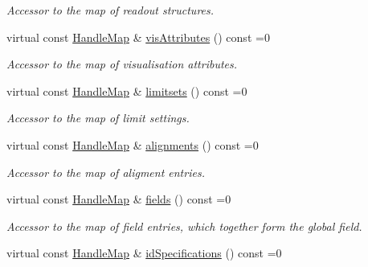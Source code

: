 \begin{DoxyCompactItemize}
\begin{DoxyCompactList}\small\item\em Accessor to the map of readout structures. \item\end{DoxyCompactList}\item 
virtual const \hyperlink{class_d_d4hep_1_1_geometry_1_1_l_c_d_d_a05cb11e7355772c7b0794bcca59bf477}{HandleMap} \& \hyperlink{class_d_d4hep_1_1_geometry_1_1_l_c_d_d_abb60505e37d62147725d126cb21d171b}{visAttributes} () const =0
\begin{DoxyCompactList}\small\item\em Accessor to the map of visualisation attributes. \item\end{DoxyCompactList}\item 
virtual const \hyperlink{class_d_d4hep_1_1_geometry_1_1_l_c_d_d_a05cb11e7355772c7b0794bcca59bf477}{HandleMap} \& \hyperlink{class_d_d4hep_1_1_geometry_1_1_l_c_d_d_aeacdfb972606fef31bc1b69e6e982956}{limitsets} () const =0
\begin{DoxyCompactList}\small\item\em Accessor to the map of limit settings. \item\end{DoxyCompactList}\item 
virtual const \hyperlink{class_d_d4hep_1_1_geometry_1_1_l_c_d_d_a05cb11e7355772c7b0794bcca59bf477}{HandleMap} \& \hyperlink{class_d_d4hep_1_1_geometry_1_1_l_c_d_d_a48553ea87301f9eb1237e41e7e2a0f16}{alignments} () const =0
\begin{DoxyCompactList}\small\item\em Accessor to the map of aligment entries. \item\end{DoxyCompactList}\item 
virtual const \hyperlink{class_d_d4hep_1_1_geometry_1_1_l_c_d_d_a05cb11e7355772c7b0794bcca59bf477}{HandleMap} \& \hyperlink{class_d_d4hep_1_1_geometry_1_1_l_c_d_d_af2622f438504300116fabfa214b23be5}{fields} () const =0
\begin{DoxyCompactList}\small\item\em Accessor to the map of field entries, which together form the global field. \item\end{DoxyCompactList}\item 
virtual const \hyperlink{class_d_d4hep_1_1_geometry_1_1_l_c_d_d_a05cb11e7355772c7b0794bcca59bf477}{HandleMap} \& \hyperlink{class_d_d4hep_1_1_geometry_1_1_l_c_d_d_a16ddadf18c24ad54b816354107338a80}{idSpecifications} () const =0

\end{DoxyCompactItemize}
